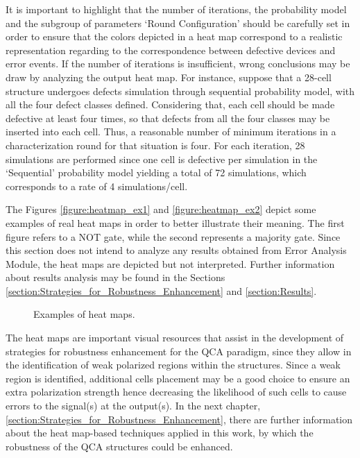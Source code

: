 It is important to highlight that the number of iterations, the probability model and the subgroup of parameters `Round Configuration' should be carefully set in order to ensure that the colors depicted in a heat map correspond to a realistic representation regarding to the correspondence between defective devices and error events. If the number of iterations is insufficient, wrong conclusions may be draw by analyzing the output heat map. For instance, suppose that a 28-cell structure undergoes defects simulation through sequential probability model, with all the four defect classes defined. Considering that, each cell should be made defective at least four times, so that defects from all the four classes may be inserted into each cell. Thus, a reasonable number of minimum iterations in a characterization round for that situation is four. For each iteration, 28 simulations are performed \textemdash since one cell is defective per simulation in the `Sequential' probability model \textemdash yielding a total of 72 simulations, which corresponds to a rate of 4 simulations/cell.

The Figures \ref{figure:heatmap_ex1} and \ref{figure:heatmap_ex2} depict some examples of real heat maps in order to better illustrate their meaning. The first figure refers to a NOT gate, while the second represents a majority gate. Since this section does not intend to analyze any results obtained from Error Analysis Module, the heat maps are depicted but not interpreted. Further information about results analysis may be found in the Sections \ref{section:Strategies_for_Robustness_Enhancement} and \ref{section:Results}.

\begin{figure}[H]
\center
{}
\hfill
{}
\caption{Examples of heat maps.}
\label{figure:heatmap_examples}
\end{figure}

The heat maps are important visual resources that assist in the development of strategies for robustness enhancement for the QCA paradigm, since they allow in the identification of weak polarized regions within the structures. Since a weak region is identified, additional cells placement may be a good choice to ensure an extra polarization strength hence decreasing the likelihood of such cells to cause errors to the signal(s) at the output(s). In the next chapter, \ref{section:Strategies_for_Robustness_Enhancement}, there are further information about the heat map-based techniques applied in this work, by which the robustness of the QCA structures could be enhanced.